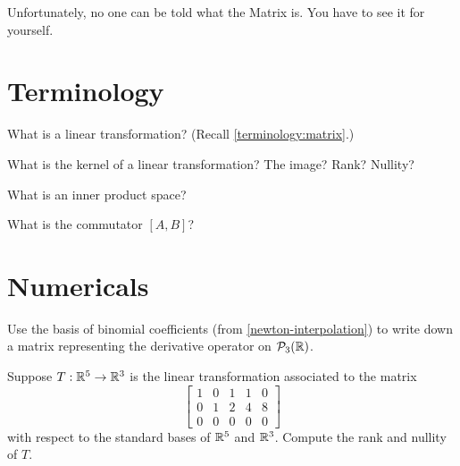 \documentclass{homework}
\author{Jim Fowler}
\begin{document}
\maketitle

\begin{inspiration}
Unfortunately, no one can be told what the Matrix is. You have to see it for yourself.
\end{inspiration}

\section{Terminology}

\begin{problem}
  What is  a linear transformation?  (Recall \ref{terminology:matrix}.)
\end{problem}

\begin{problem}
  What is the kernel of a linear transformation?  The image?  Rank?  Nullity?
\end{problem}

\begin{problem}\label{definition-inner-product}
  What is an inner product space?
\end{problem}

\begin{problem}\label{definition-commutator}
  What is the commutator $[A,B]$?
\end{problem}

\section{Numericals}

\begin{problem}
  Use the basis of binomial coefficients (from
  \ref{newton-interpolation}) to write down a matrix representing the
  derivative operator on $\mathcal{P}_{3}(\mathbb{R})$.
\end{problem}

\begin{problem}
  Suppose $T : \mathbb{R}^5 \to \mathbb{R}^3$ is the linear transformation associated to the matrix
  \[\begin{bmatrix}
    1 & 0 & 1 & 1 & 0 \\
    0 & 1 & 2 & 4 & 8 \\
    0 & 0 & 0 & 0 & 0
  \end{bmatrix}\]
  with respect to the standard bases of $\mathbb{R}^5$ and $\mathbb{R}^3$.  Compute the rank and nullity of $T$.
\end{problem}
\end{document}
